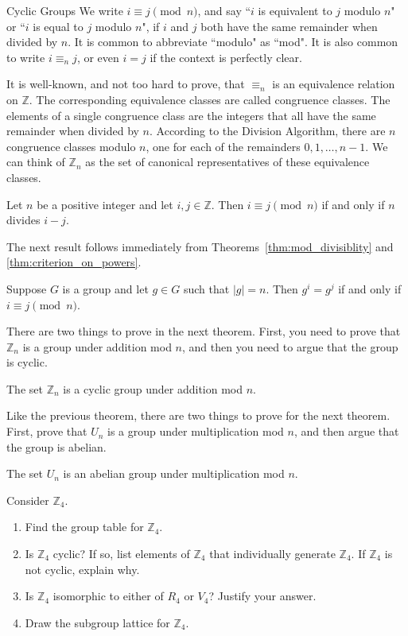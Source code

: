 \begin{section}{Cyclic Groups}
We write $i\equiv j\pmod n$, and say ``$i$ is equivalent to $j$ modulo $n$" or ``$i$ is equal to $j$ modulo $n$", if $i$ and $j$ both have the same remainder when divided by $n$.  It is common to abbreviate ``modulo" as ``mod".  It is also common to write $i\equiv_n j$, or even $i=j$ if the context is perfectly clear.  

It is well-known, and not too hard to prove, that $\equiv_n$ is an equivalence relation on $\mathbb{Z}$.  The corresponding equivalence classes are called congruence classes.  The elements of a single congruence class are the integers that all have the same remainder when divided by $n$. According to the Division Algorithm, there are $n$ congruence classes modulo $n$, one for each of the remainders $0,1,\ldots, n-1$. We can think of $\mathbb{Z}_n$ as the set of canonical representatives of these equivalence classes.

\begin{theorem}\label{thm:mod_divisiblity}
Let $n$ be a positive integer and let $i,j\in\mathbb{Z}$. Then $i\equiv j\pmod n$ if and only if $n$ divides $i-j$.
\end{theorem}

The next result follows immediately from Theorems~\ref{thm:mod_divisiblity} and \ref{thm:criterion_on_powers}.

\begin{corollary}
Suppose $G$ is a group and let $g\in G$ such that $|g|=n$.  Then $g^i=g^j$ if and only if $i\equiv j\pmod n$.
\end{corollary}

There are two things to prove in the next theorem.  First, you need to prove that $\mathbb{Z}_n$ is a group under addition mod $n$, and then you need to argue that the group is cyclic.

\begin{theorem}
The set $\mathbb{Z}_n$ is a cyclic group under addition mod $n$.
\end{theorem}

Like the previous theorem, there are two things to prove for the next theorem. First, prove that $U_n$ is a group under multiplication mod $n$, and then argue that the group is abelian.

\begin{theorem}
The set $U_n$ is an abelian group under multiplication mod $n$.
\end{theorem}

\begin{problem}
Consider $\mathbb{Z}_4$.
\begin{enumerate}[label=\textrm{(\alph*)}]
\item Find the group table for $\mathbb{Z}_4$.
\item Is $\mathbb{Z}_4$ cyclic? If so, list elements of $\mathbb{Z}_4$ that individually generate $\mathbb{Z}_4$.  If $\mathbb{Z}_4$ is not cyclic, explain why.
\item Is $\mathbb{Z}_4$ isomorphic to either of $R_4$ or $V_4$? Justify your answer.
\item Draw the subgroup lattice for $\mathbb{Z}_4$.
\end{enumerate}
\end{problem}


\end{section}

